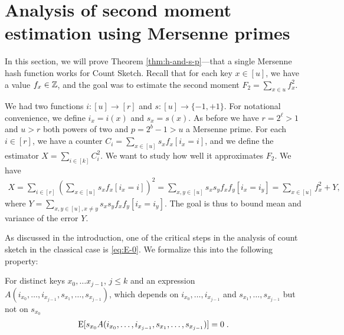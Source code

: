 


\section{Analysis of second moment estimation using Mersenne primes}
\label{sec:analysis-two-for-one}
In this section, we will prove Theorem \ref{thm:h-and-s-p}---that a single Mersenne hash function works for Count Sketch.
Recall that for each key $x\in [u]$, we have a value $f_x\in \mathbb Z$, and the
goal was to estimate the second moment $F_2 = \sum_{x\in u}f_x^2$.

We had two functions $i:[u]\to[r]$ and $s:[u]\to\{-1,+1\}$. 
For notational convenience, we define $i_x=i(x)$ and $s_x=s(x)$.
As before we have $r=2^\ell>1$ and $u>r$ both powers of two and $p=2^b-1>u$ a Mersenne prime.
For each $i\in [r]$, we have a counter 
$C_i=\sum_{x\in[u]} s_x f_x[i_x=i]$, and we define the 
estimator $X=\sum_{i\in[k]} C_i^2$. We want to study how
well it approximates $F_2$.
We have 
\begin{align}
X=\sum_{i\in[r]}\left( \sum_{x\in[u]}s_x f_x[i_x=i]\right)^2
=\sum_{x,y\in[u]}s_x s_y f_x f_y[i_x=i_y]
=\sum_{x\in[u]} f_x^2+Y,
\label{eq:decomp}
\end{align}
where $Y=\sum_{x,y\in[u],x\neq y} s_x s_y f_x f_y [i_x = i_y]$.
The goal is thus to bound mean and variance of the error $Y$.

As discussed in the introduction, one of the critical steps in the analysis of count sketch in the classical case is \cref{eq:E-0}.
We formalize this into the following property:
\begin{property}\label{prop:independence}
    For distinct keys $x_0, \ldots x_{j - 1}$, $j \le k$
    and an expression $A(i_{x_0}, \ldots, i_{x_{j - 1}}, s_{x_1}, \ldots, s_{x_{j - 1}})$,
    which depends on $i_{x_0}, \ldots, i_{x_{j - 1}}$ and $s_{x_1}, \ldots, s_{x_{j - 1}}$
    but not on $s_{x_0}$
    \begin{align}
        \operatorname*{E}[s_{x_0} A(i_{x_0}, \ldots, i_{x_{j - 1}}, s_{x_1}, \ldots, s_{x_{j - 1}})] = 0\; .
    \end{align}
\end{property}

